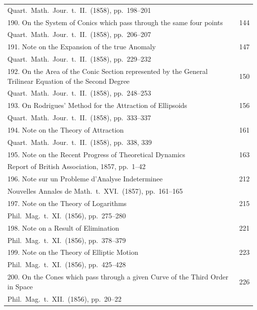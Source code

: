 \documentclass[11pt,a4paper]{book}
\begin{document}
\begin{longtable}{p{}r}
\multicolumn{2}{l}{\small Quart.\ Math.\ Jour.\ t.~II.\ (1858), pp.~198--201} \\[0.5em]
%
190. On the System of Conics which pass through the same four points \dotfill & 144 \\
\multicolumn{2}{l}{\small Quart.\ Math.\ Jour.\ t.~II.\ (1858), pp.~206--207} \\[0.5em]
%
191. Note on the Expansion of the true Anomaly \dotfill & 147 \\
\multicolumn{2}{l}{\small Quart.\ Math.\ Jour.\ t.~II.\ (1858), pp.~229--232} \\[0.5em]
%
192. On the Area of the Conic Section represented by the General Trilinear Equation of the Second Degree \dotfill & 150 \\
\multicolumn{2}{l}{\small Quart.\ Math.\ Jour.\ t.~II.\ (1858), pp.~248--253} \\[0.5em]
%
193. On Rodrigues' Method for the Attraction of Ellipsoids \dotfill & 156 \\
\multicolumn{2}{l}{\small Quart.\ Math.\ Jour.\ t.~II.\ (1858), pp.~333--337} \\[0.5em]
%
194. Note on the Theory of Attraction \dotfill & 161 \\
\multicolumn{2}{l}{\small Quart.\ Math.\ Jour.\ t.~II.\ (1858), pp.~338, 339} \\[0.5em]
%
195. Note on the Recent Progress of Theoretical Dynamics \dotfill & 163 \\
\multicolumn{2}{l}{\small Report of British Association, 1857, pp.~1--42} \\[0.5em]
%
196. Note sur un Probleme d'Analyse Indeterminee \dotfill & 212 \\
\multicolumn{2}{l}{\small Nouvelles Annales de Math.\ t.~XVI.\ (1857), pp.~161--165} \\[0.5em]
%
197. Note on the Theory of Logarithms \dotfill & 215 \\
\multicolumn{2}{l}{\small Phil.\ Mag.\ t.~XI.\ (1856), pp.~275--280} \\[0.5em]
%
198. Note on a Result of Elimination \dotfill & 221 \\
\multicolumn{2}{l}{\small Phil.\ Mag.\ t.~XI.\ (1856), pp.~378--379} \\[0.5em]
%
199. Note on the Theory of Elliptic Motion \dotfill & 223 \\
\multicolumn{2}{l}{\small Phil.\ Mag.\ t.~XI.\ (1856), pp.~425--428} \\[0.5em]
%
200. On the Cones which pass through a given Curve of the Third Order in Space \dotfill & 226 \\
\multicolumn{2}{l}{\small Phil.\ Mag.\ t.~XII.\ (1856), pp.~20--22} \\[0.5em]
\bottomrule
\end{longtable}
\end{document}
